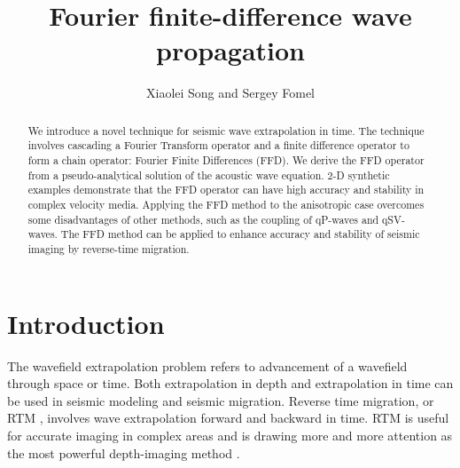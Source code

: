 \title{Fourier finite-difference wave propagation}


\author{Xiaolei Song and Sergey Fomel}



\address{Bureau of Economic Geology \\
John A. and Katherine G. Jackson School of Geosciences \\
The University of Texas at Austin \\
University Station, Box X \\
Austin, TX 78713-8924}


\maketitle

\begin{abstract}
  We introduce a novel technique for seismic wave extrapolation in
  time.  The technique involves cascading a Fourier Transform operator
  and a finite difference operator to form a chain operator: 
  Fourier Finite Differences (FFD).  We derive the FFD operator from a
  pseudo-analytical solution of the acoustic wave equation.  2-D
  synthetic examples demonstrate that the FFD operator can have high
  accuracy and stability in complex velocity media. 
  Applying the FFD method to the anisotropic case overcomes some
  disadvantages of other methods, such as the coupling of qP-waves and
  qSV-waves.  The FFD method can be applied to enhance accuracy and
  stability of seismic imaging by reverse-time migration.
\end{abstract}

\section{Introduction}

The wavefield extrapolation problem refers to advancement of a
wavefield through space or time.  Both extrapolation in depth and
extrapolation in time can be used in seismic modeling and seismic
migration.  Reverse time migration, or RTM
\cite[]{baysal,McMechan,whitmore,levin}, involves wave extrapolation
forward and backward in time. RTM is useful for accurate imaging in
complex areas and is drawing more and more attention as the most
powerful depth-imaging method \cite[]{yoon,sym,fletcher,fowler}.\\

